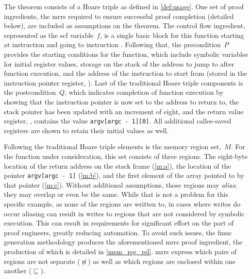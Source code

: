 The theorem consists of a Hoare triple as defined in \cref{def:usage}.%
One set of proof ingredients,
the \acp{mrr} required to ensure successful proof completion (detailed below),
are included as assumptions on the theorem.
The control flow ingredient,
represented as the \ac{scf} variable~$f$, is a single basic block for this function
starting at instruction  and going to instruction .
Following that,
the precondition~$P$ provides the starting conditions for the function,%
which include symbolic variables for initial register values,
storage on the stack of the address to jump to after function execution,
and the address of the instruction to start from
(stored in the instruction pointer register, ).
Last of the traditional Hoare triple components is the postcondition~$Q$,%
which indicates completion of function execution
by showing that the instruction pointer is now set to the address to return to,
the stack pointer  has been updated with an increment of eight,
and the return value register, ,
contains the value \lstinline|argv[argc - 1][0]|.
All additional callee-saved registers are shown to retain their initial values%
as well.

Following the traditional Hoare triple elements is the memory region set,~$M$.%
For the function under consideration, this set consists of three regions.
The eight-byte location of the return address
on the stack frame (\cref{m:a}),
the location of the pointer \lstinline|argv[argc - 1]| (\cref{m:b}),
and the first element of the array pointed to by that pointer (\cref{m:c}).
Without additional assumptions, those regions may \emph{alias};%
they may overlap or even be the same.
While that is not a problem for this specific example,
as none of the regions are written to, in cases where writes do occur
aliasing can result in writes to regions
that are not considered by symbolic execution.
This can result in requirements for significant effort on the part of proof engineers,
greatly reducing automation.
To avoid such issues, the \ac{fmuc} generation methodology
produces the aforementioned \acp{mrr} proof ingredient,%
the production of which is detailed in \cref{mem_reg_rel}.
\Acp{mrr} express which pairs of regions are not separate ($\not\bowtie$)%
as well as which regions are enclosed within one another ($\sqsubseteq$).%

